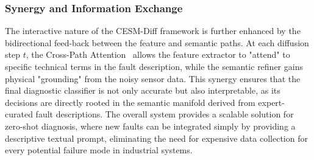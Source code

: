 \subsubsection{Synergy and Information Exchange}
The interactive nature of the CESM-Diff framework is further enhanced by the bidirectional feed-back between the feature and semantic paths. At each diffusion step $t$, the Cross-Path Attention~\cite{vaswani2017attention} allows the feature extractor to "attend" to specific technical terms in the fault description, while the semantic refiner gains physical "grounding" from the noisy sensor data. This synergy ensures that the final diagnostic classifier is not only accurate but also interpretable, as its decisions are directly rooted in the semantic manifold derived from expert-curated fault descriptions. The overall system provides a scalable solution for zero-shot diagnosis, where new faults can be integrated simply by providing a descriptive textual prompt, eliminating the need for expensive data collection for every potential failure mode in industrial systems.
